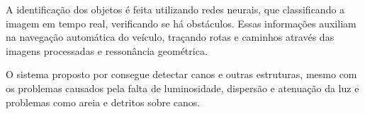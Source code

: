 
A identificação dos objetos é feita utilizando redes neurais, que classificando a imagem em tempo real, verificando se há obstáculos. Essas informações auxiliam na navegação automática do veículo, traçando rotas e caminhos através das imagens processadas e ressonância geométrica.

O sistema proposto por  consegue detectar canos e outras estruturas, mesmo com os problemas causados pela falta de luminosidade, dispersão e atenuação da luz e problemas como areia e detritos sobre canos.





